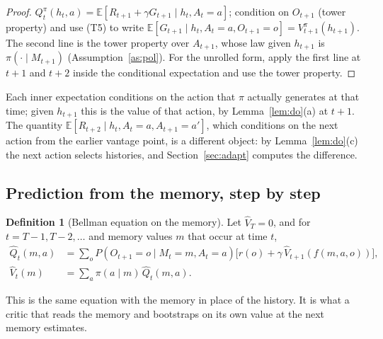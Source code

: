 \documentclass{article}
\theoremstyle{definition}
\newtheorem{definition}[proposition]{Definition}
\theoremstyle{remark}
\newcommand{\E}{\mathbb{E}}
\begin{document}
\begin{proof}
$Q^\pi_t(h_t,a)=\E[R_{t+1}+\gamma G_{t+1}\mid h_t,A_t=a]$; condition on $O_{t+1}$ (tower property) and use (T5) to write $\E[G_{t+1}\mid h_t,A_t=a,O_{t+1}=o]=V^\pi_{t+1}(h_{t+1})$. The second line is the tower property over $A_{t+1}$, whose law given $h_{t+1}$ is $\pi(\cdot\mid M_{t+1})$ (Assumption~\ref{as:pol}). For the unrolled form, apply the first line at $t+1$ and $t+2$ inside the conditional expectation and use the tower property.
\end{proof}

Each inner expectation conditions on the action that $\pi$ actually generates at that time; given $h_{t+1}$ this is the value of that action, by Lemma~\ref{lem:do}(a) at $t+1$. The quantity $\E[R_{t+2}\mid h_t,A_t=a,A_{t+1}=a']$, which conditions on the next action from the earlier vantage point, is a different object: by Lemma~\ref{lem:do}(c) the next action selects histories, and Section~\ref{sec:adapt} computes the difference.

\subsection{Prediction from the memory, step by step}

\begin{definition}[Bellman equation on the memory]\label{def:bellman-m}
Let $\hat V_T=0$, and for $t=T-1,T-2,\dots$ and memory values $m$ that occur at time $t$,
\begin{align*}
\hat Q_t(m,a)&=\sum_oP(O_{t+1}=o\mid M_t=m,A_t=a)\big[r(o)+\gamma\,\hat V_{t+1}(f(m,a,o))\big],\\
\hat V_t(m)&=\sum_a\pi(a\mid m)\,\hat Q_t(m,a).
\end{align*}
\end{definition}

This is the same equation with the memory in place of the history. It is what a critic that reads the memory and bootstraps on its own value at the next memory estimates.
\end{document}
